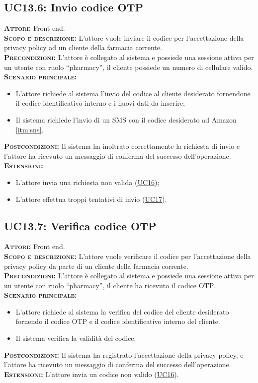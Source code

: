 \subsection{UC13.6: Invio codice OTP}
\label{sec:UC136}
\textsc{\textbf{Attori:}} Front end.\\
\textsc{\textbf{Scopo e descrizione:}} L'attore vuole inviare il codice per l'accettazione della privacy policy ad un cliente della farmacia corrente.\\
\textsc{\textsc{\textbf{Precondizioni:}}} L'attore è collegato al sistema e possiede una sessione attiva per un utente con ruolo ``pharmacy'', il cliente possiede un numero di cellulare valido.\\
\textsc{\textbf{Scenario principale:}} 
\begin{itemize}
    \item L'attore richiede al sistema l'invio del codice al cliente desiderato fornendone il codice identificativo interno e i nuovi dati da inserire;
    \item Il sistema richiede l'invio di un SMS con il codice desiderato ad Amazon \ref{itm:sns}.
\end{itemize}
\textsc{\textbf{Postcondizioni:}} Il sistema ha inoltrato correttamente la richiesta di invio e l'attore ha ricevuto un messaggio di conferma del successo dell'operazione.\\
\textsc{\textbf{Estensioni:}} \begin{itemize}
    \item L'attore invia una richiesta non valida (\hyperref[sec:UC16]{UC16});
    \item L'attore effettua troppi tentativi di invio (\hyperref[sec:UC17]{UC17}).
\end{itemize}

\subsection{UC13.7: Verifica codice OTP}
\label{sec:UC137}
\textsc{\textbf{Attori:}} Front end.\\
\textsc{\textbf{Scopo e descrizione:}} L'attore vuole verificare il codice per l'accettazione della privacy policy da parte di un cliente della farmacia corrente.\\
\textsc{\textsc{\textbf{Precondizioni:}}} L'attore è collegato al sistema e possiede una sessione attiva per un utente con ruolo ``pharmacy'', il cliente ha ricevuto il codice OTP.\\
\textsc{\textbf{Scenario principale:}} \begin{itemize}
    \item L'attore richiede al sistema la verifica del codice del cliente desiderato fornendo il codice OTP e il codice identificativo interno del cliente.
    \item Il sistema verifica la validità del codice.
\end{itemize}
\textsc{\textbf{Postcondizioni:}} Il sistema ha registrato l'accettazione della privacy policy, e l'attore ha ricevuto un messaggio di conferma del successo dell'operazione.\\
\textsc{\textbf{Estensioni:}} L'attore invia un codice non valido (\hyperref[sec:UC16]{UC16}).

